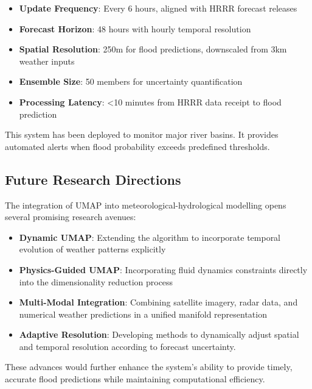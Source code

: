 \documentclass{article}
\begin{document}
\begin{itemize}
\item \textbf{Update Frequency}: Every 6 hours, aligned with HRRR forecast releases
\item \textbf{Forecast Horizon}: 48 hours with hourly temporal resolution
\item \textbf{Spatial Resolution}: 250m for flood predictions, downscaled from 3km weather inputs
\item \textbf{Ensemble Size}: 50 members for uncertainty quantification
\item \textbf{Processing Latency}: <10 minutes from HRRR data receipt to flood prediction
\end{itemize}

This system has been deployed to monitor major river basins. It provides automated alerts when flood probability exceeds predefined thresholds.

\subsection{Future Research Directions}
The integration of UMAP into meteorological-hydrological modelling opens several promising research avenues:

\begin{itemize}
\item \textbf{Dynamic UMAP}: Extending the algorithm to incorporate temporal evolution of weather patterns explicitly
\item \textbf{Physics-Guided UMAP}: Incorporating fluid dynamics constraints directly into the dimensionality reduction process
\item \textbf{Multi-Modal Integration}: Combining satellite imagery, radar data, and numerical weather predictions in a unified manifold representation
\item \textbf{Adaptive Resolution}: Developing methods to dynamically adjust spatial and temporal resolution according to forecast uncertainty.
\end{itemize}

These advances would further enhance the system's ability to provide timely, accurate flood predictions while maintaining computational efficiency.
\end{document}
